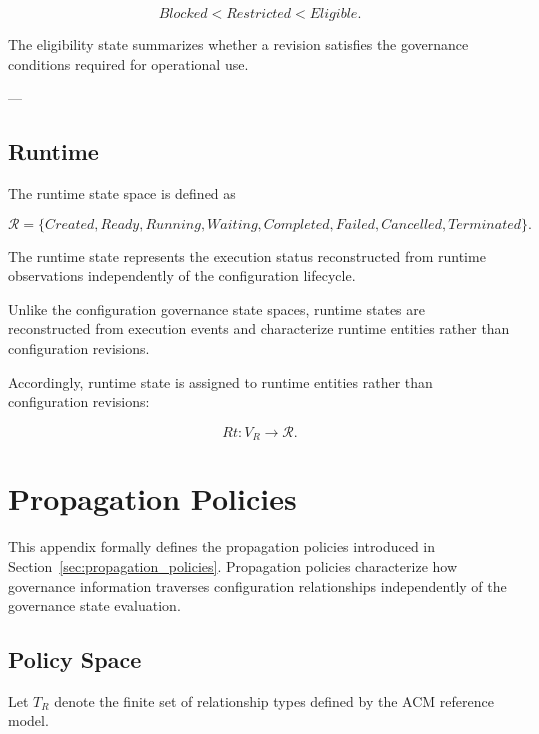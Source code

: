 \documentclass[10pt]{article}
\begin{document}
\begin{equation}
	Blocked
	<
	Restricted
	<
	Eligible.
	\label{eq:eligibility_order}
\end{equation}

The eligibility state summarizes whether a revision satisfies the governance conditions required for operational use.

---

\subsection{Runtime}

The runtime state space is defined as

\begin{equation}
	\mathcal{R}=
	\{
	Created,
	Ready,
	Running,
	Waiting,
	Completed,
	Failed,
	Cancelled,
	Terminated
	\}.
	\label{eq:runtime_space}
\end{equation}

The runtime state represents the execution status reconstructed from runtime observations independently of the configuration lifecycle.

Unlike the configuration governance state spaces, runtime states are reconstructed from execution events and characterize runtime entities rather than configuration revisions.

Accordingly, runtime state is assigned to runtime entities rather than
configuration revisions:

\begin{equation}
	Rt:V_R\rightarrow\mathcal{R}.
	\label{eq:runtime_state_assignment}
\end{equation}

\section{Propagation Policies}
\label{appendix:propagation_policies}

This appendix formally defines the propagation policies introduced in Section~\ref{sec:propagation_policies}. Propagation policies characterize how governance information traverses configuration relationships independently of the governance state evaluation.

\subsection{Policy Space}

Let $T_R$ denote the finite set of relationship types defined by the ACM reference model.
\end{document}
